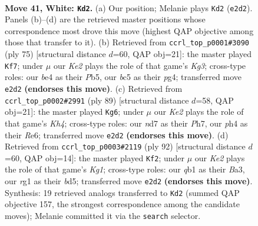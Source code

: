\documentclass[11pt]{article}
\begin{document}
\clearpage

\begin{figure}[p]\centering
\begin{subfigure}{0.46\textwidth}\centering
\resizebox{\linewidth}{!}{%
\newchessgame
\chessboard[
  setfen={2k3n1/3n4/8/2b3p1/4b1Pp/7P/4K3/1q4r1 w - - 0 41},
  showmover=false,
  pgfstyle=straightmove, color=movearrow, markmove={e2-d2}
]}
\caption{}
\end{subfigure}\hfill
\begin{subfigure}{0.46\textwidth}\centering
\resizebox{\linewidth}{!}{%
\newchessgame
\chessboard[
  setfen={2r5/7p/3p2k1/1p6/6P1/1bPRB2P/5K2/8 b - - 0 38},
  showmover=false,
  pgfstyle=straightmove, color=movearrow, markmove={g6-f7}
]}
\caption{}
\end{subfigure}
\\[4pt]
\begin{subfigure}{0.46\textwidth}\centering
\resizebox{\linewidth}{!}{%
\newchessgame
\chessboard[
  setfen={8/7p/4r3/6pk/1R6/3K1bP1/1P1B1P2/8 b - - 1 45},
  showmover=false,
  pgfstyle=straightmove, color=movearrow, markmove={h5-g6}
]}
\caption{}
\end{subfigure}\hfill
\begin{subfigure}{0.46\textwidth}\centering
\resizebox{\linewidth}{!}{%
\newchessgame
\chessboard[
  setfen={8/6p1/1P3p2/3b3p/4k3/BP4PP/8/6K1 w - - 1 47},
  showmover=false,
  pgfstyle=straightmove, color=movearrow, markmove={g1-f2}
]}
\caption{}
\end{subfigure}
\caption{\textbf{Move 41, White: \texttt{Kd2}.} (a) Our position; Melanie plays \texttt{Kd2} (\texttt{e2d2}). Panels (b)--(d) are the retrieved master positions whose correspondence most drove this move (highest QAP objective among those that transfer to it). (b) Retrieved from \texttt{ccrl\_top\_p0001\#3090} (ply 75) [structural distance $d$=60, QAP obj=21]: the master played \texttt{Kf7}; under $\mu$ our \emph{Ke2} plays the role of that game's \emph{Kg3}; cross-type roles: our \emph{b}e4 as their \emph{P}b5, our \emph{b}c5 as their \emph{p}g4; transferred move \texttt{e2d2} \textbf{(endorses this move)}. (c) Retrieved from \texttt{ccrl\_top\_p0002\#2991} (ply 89) [structural distance $d$=58, QAP obj=21]: the master played \texttt{Kg6}; under $\mu$ our \emph{Ke2} plays the role of that game's \emph{Kh4}; cross-type roles: our \emph{n}d7 as their \emph{P}h7, our \emph{p}h4 as their \emph{R}e6; transferred move \texttt{e2d2} \textbf{(endorses this move)}. (d) Retrieved from \texttt{ccrl\_top\_p0003\#2119} (ply 92) [structural distance $d$=60, QAP obj=14]: the master played \texttt{Kf2}; under $\mu$ our \emph{Ke2} plays the role of that game's \emph{Kg1}; cross-type roles: our \emph{q}b1 as their \emph{B}a3, our \emph{r}g1 as their \emph{b}d5; transferred move \texttt{e2d2} \textbf{(endorses this move)}. Synthesis: 19 retrieved analogs transferred to \texttt{Kd2} (summed QAP objective 157, the strongest correspondence among the candidate moves); Melanie committed it via the \texttt{search} selector.}
\label{fig:thought-m80}
\end{figure}
\end{document}
